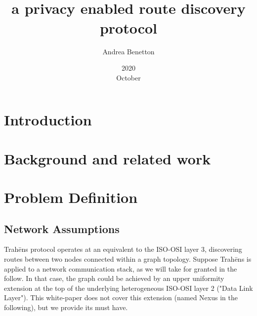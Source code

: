 \documentclass[12pt,oneside]{wlscirep}
\title{\ProtoName \\ a privacy enabled route discovery protocol}
\date{2020\\ October}
\author[1,*]{Andrea Benetton}
\affil[1]{BlueTeam OÜ, Tallinn, Estonia}
\affil[*]{andrea.benetton@blueteam.ee}
\newcommand{\ProtoName}{Trah\={e}ns }
\begin{document}
      
\flushbottom
\maketitle
%
%
\thispagestyle{empty}
\vfill
\noindent 
\clearpage
\linenumbers

\section{Introduction}
\label{sec:intro}

\clearpage
\section{Background and related work}
\label{sec:background}

\clearpage
\section{Problem Definition}
\subsection{Network Assumptions}
\ProtoName protocol operates at an equivalent to the ISO-OSI layer 3, discovering routes between two nodes connected within a graph topology. Suppose \ProtoName is applied to a network communication stack, as we will take for granted in the follow. In that case, the graph could be achieved by an upper uniformity extension at the top of the underlying heterogeneous ISO-OSI layer 2 ("Data Link Layer"). This white-paper does not cover this extension (named Nexus in the following), but we provide its must have.\par
\end{document}
